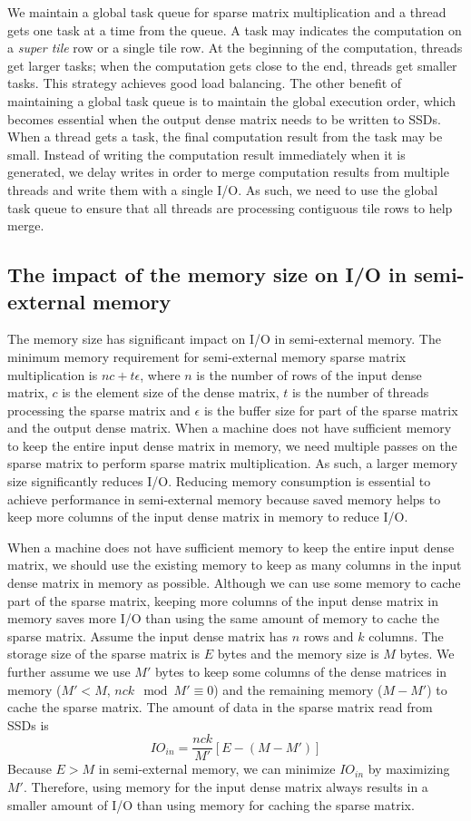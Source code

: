 We maintain a global task queue for sparse matrix multiplication and a
thread gets one task at a time from the queue. A task may
indicates the computation on a \textit{super tile} row or a single tile row.
At the beginning of the computation, threads get larger tasks; when
the computation gets close to the end, threads get smaller tasks. This strategy
achieves good load balancing. The other benefit of maintaining a global
task queue is to maintain the global execution order, which becomes essential
when the output dense matrix needs to be written to SSDs. When a thread gets
a task, the final computation result from the task may be small. Instead of
writing the computation result immediately when it is generated, we delay
writes in order to merge
computation results from multiple threads and write them with a single I/O.
As such, we need to use the global task queue to ensure that all threads are
processing contiguous tile rows to help merge.

\subsection{The impact of the memory size on I/O in semi-external memory}
\label{sec:mem}
The memory size has significant impact on I/O in semi-external memory.
The minimum memory requirement for semi-external memory sparse matrix
multiplication is $n c + t \epsilon$, where $n$ is the number of rows
of the input dense matrix, $c$ is the element size of the dense matrix,
$t$ is the number of threads processing the sparse matrix
and $\epsilon$ is the buffer size for part of the sparse matrix and the output
dense matrix. When a machine does not have sufficient memory to keep the entire
input dense matrix in memory, we need multiple passes on the sparse matrix to
perform sparse matrix multiplication. As such, a larger memory size significantly
reduces I/O. Reducing memory consumption is essential to achieve performance
in semi-external memory because saved memory helps to keep more columns of
the input dense matrix in memory to reduce I/O.

When a machine does not have sufficient memory to keep the entire input dense
matrix, we should use the existing memory to keep as many columns in the input
dense matrix in memory as possible. Although we can use some memory to cache
part of the sparse matrix,
keeping more columns of the input dense matrix in memory saves more I/O than
using the same amount of memory to cache the sparse matrix. Assume the input
dense matrix has $n$ rows and $k$ columns. The storage size of the sparse
matrix is $E$ bytes and the memory size is $M$ bytes. We further assume
we use $M'$ bytes to keep some columns of the dense matrices in memory
($M' < M$, ${n c k} \mod {M'} \equiv 0$)
and the remaining memory ($M - M'$) to cache the sparse matrix.
The amount of data in the sparse matrix read from SSDs is
\begin{equation*}
IO_{in} = \frac{n c k}{M'} [E - (M - M')]
\end{equation*}
Because $E > M$ in semi-external memory, we can minimize $IO_{in}$ by maximizing $M'$.
Therefore, using memory for the input dense matrix always results in a smaller
amount of I/O than using memory for caching the sparse matrix.

